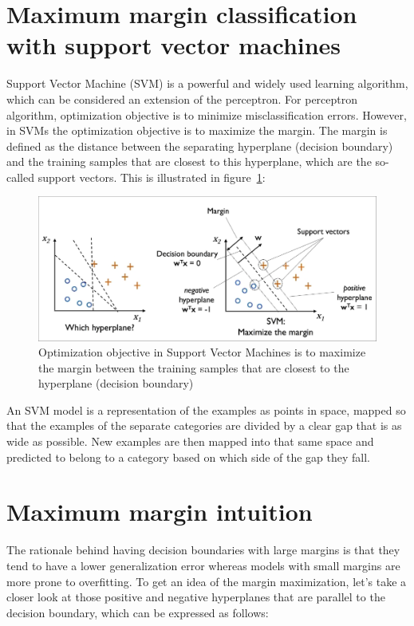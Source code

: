 \documentclass[11pt]{article}
\begin{document}
    \section{Maximum margin classification with support vector machines} \label{sec:max_marg_class}

    Support Vector Machine (SVM) is a powerful and widely used learning algorithm, which can be considered
    an extension of the perceptron.
    For perceptron algorithm, optimization objective is to minimize misclassification errors.
    However, in SVMs the optimization objective is to maximize the margin.
    The margin is defined as the distance between the separating hyperplane (decision boundary) and the training
    samples that are closest to this hyperplane, which are the so-called support vectors.
    This is illustrated in figure~\ref{fig:svm}:

    \begin{figure}[hbt!]
        \centering
        \includegraphics[width=1\linewidth,trim=4 4 4 4,clip]{img/svm.jpg}
        \caption{Optimization objective in Support Vector Machines is to maximize the margin between the training samples
        that are closest to the hyperplane (decision boundary)}
        \label{fig:svm}
    \end{figure}

    An SVM model is a representation of the examples as points in space, mapped so that the examples of the separate
    categories are divided by a clear gap that is as wide as possible.
    New examples are then mapped into that same space and predicted to belong to a category based on which side of
    the gap they fall.

    \section{Maximum margin intuition} \label{sec:max_marg_int}

    The rationale behind having decision boundaries with large margins is that they tend to have a lower
    generalization error whereas models with small margins are more prone to overfitting.
    To get an idea of the margin maximization, let's take a closer look at those positive and
    negative hyperplanes that are parallel to the decision boundary, which can be expressed as follows:
\end{document}
